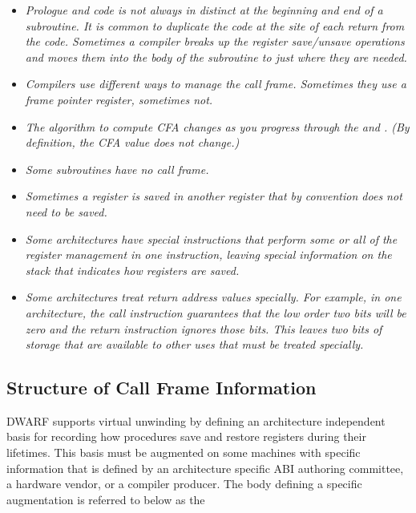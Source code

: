 \begin{itemize} %

\item \textit{Prologue 
and 
 code is not always in 
distinct 
at the beginning and end of a subroutine. It is common
to duplicate the  code 
at the site of each return
from the code. Sometimes a compiler breaks up the register
save/unsave operations and moves them into the body of the
subroutine to just where they are needed.}


\item \textit{Compilers use different ways to manage the call
frame. Sometimes they use a frame pointer register, sometimes
not.}

\item \textit{The algorithm to compute CFA changes as you progress through
the  
and . 
(By definition, the CFA value
does not change.)}

\item \textit{Some subroutines have no call frame.}

\item \textit{Sometimes a register is saved in another register that by
convention does not need to be saved.}

\item \textit{Some architectures have special instructions that perform
some or all of the register management in one instruction,
leaving special information on the stack that indicates how
registers are saved.}

\item \textit{Some architectures treat return address values specially. For
example, in one architecture, the call instruction guarantees
that the low order two bits will be zero and the return
instruction ignores those bits. This leaves two bits of
storage that are available to other uses that must be treated
specially.}

\end{itemize}


\subsection{Structure of Call Frame Information}
\label{chap:structureofcallframeinformation}

DWARF supports virtual unwinding by defining an architecture
independent basis for recording how procedures save and restore
registers during their lifetimes. This basis must be augmented
on some machines with specific information that is defined by
an architecture specific ABI authoring committee, a hardware
vendor, or a compiler producer. The body defining a specific
augmentation is referred to below as the 

